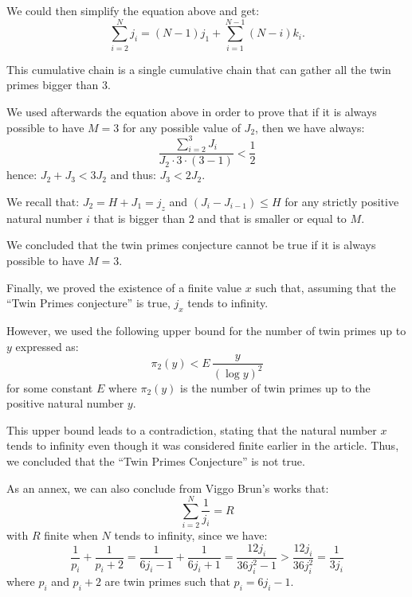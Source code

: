 \documentclass[11pt]{article}
\begin{document}
We could then simplify the equation above and get:
\begin{equation}
\sum_{i=2}^{N} j_i = (N-1)j_1 + \sum_{i=1}^{N-1}(N-i)k_i.
\end{equation}

This cumulative chain is a single cumulative chain that can gather all the twin primes bigger than $3$.

We used afterwards the equation above in order to prove that if it is always possible to have $M=3$ for any possible value of $J_2$, then we have always:
\begin{equation}
\frac{\sum_{i=2}^{3} J_i}{J_2 \cdot 3 \cdot (3-1)} < \frac{1}{2}
\end{equation}
hence: $J_2+J_3 < 3J_2$ and thus: $J_3 < 2J_2$.

We recall that: $J_2 = H+J_1 = j_z$ and $(J_i-J_{i-1}) \leq H$ for any strictly positive natural number $i$ that is bigger than $2$ and that is smaller or equal to $M$.

We concluded that the twin primes conjecture cannot be true if it is always possible to have $M=3$.

Finally, we proved the existence of a finite value $x$ such that, assuming that the ``Twin Primes conjecture'' is true, $j_x$ tends to infinity.

However, we used the following upper bound for the number of twin primes up to $y$ expressed as:
\begin{equation}
\pi_2(y) < E\,\frac{y}{(\log y)^2}
\end{equation}
for some constant $E$ where $\pi_2(y)$ is the number of twin primes up to the positive natural number $y$.

This upper bound leads to a contradiction, stating that the natural number $x$ tends to infinity even though it was considered finite earlier in the article. Thus, we concluded that the ``Twin Primes Conjecture'' is not true.

As an annex, we can also conclude from Viggo Brun's works \cite{ref4,ref5} that:
\begin{equation}
\sum_{i=2}^{N} \frac{1}{j_i} = R
\end{equation}
with $R$ finite when $N$ tends to infinity, since we have:
\begin{equation}
\frac{1}{p_i} + \frac{1}{p_i+2} = \frac{1}{6j_i-1} + \frac{1}{6j_i+1} = \frac{12 j_i}{36 j_i^2 -1} > \frac{12 j_i}{36 j_i^2} = \frac{1}{3 j_i}
\end{equation}
where $p_i$ and $p_i+2$ are twin primes such that $p_i = 6j_i - 1$.
\end{document}
